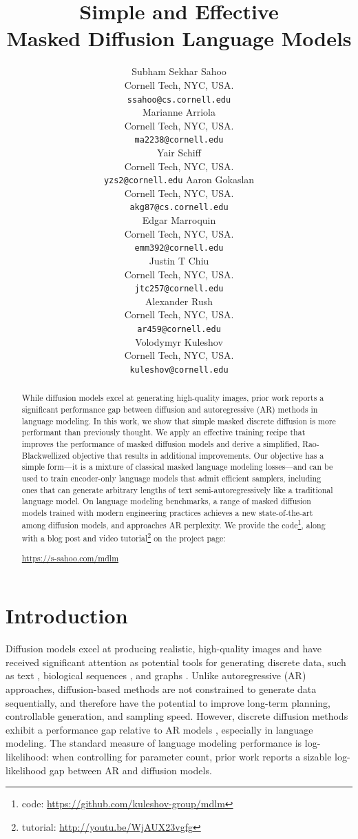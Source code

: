 \documentclass{article} %
\title{Simple and Effective \\ Masked Diffusion Language Models}
\author{%
  Subham Sekhar Sahoo\\
  Cornell Tech, NYC, USA.\\
  \texttt{ssahoo@cs.cornell.edu} \\
  \And
  Marianne Arriola\\
  Cornell Tech, NYC, USA.\\
  \texttt{ma2238@cornell.edu}\\
  \And
  Yair Schiff\\
  Cornell Tech, NYC, USA.\\
  \texttt{yzs2@cornell.edu}
  \And
  Aaron Gokaslan\\
  Cornell Tech, NYC, USA.\\
  \texttt{akg87@cs.cornell.edu} \\
  \And
  Edgar Marroquin\\
  Cornell Tech, NYC, USA.\\
  \texttt{emm392@cornell.edu} \\
  \And
  Justin T Chiu\\
  Cornell Tech, NYC, USA.\\
  \texttt{jtc257@cornell.edu}\\
  \And
  Alexander Rush\\
  Cornell Tech, NYC, USA.\\
  \texttt{ar459@cornell.edu}\\
  \And
  Volodymyr Kuleshov\\
  Cornell Tech, NYC, USA.\\
  \texttt{kuleshov@cornell.edu} \\
}
\begin{document}
\maketitle


\begin{abstract}
While diffusion models excel at generating high-quality images, prior work reports a significant performance gap between diffusion and autoregressive (AR) methods in language modeling.
In this work, we show that simple masked discrete diffusion is more performant than previously thought.
We apply an effective training recipe that improves the performance of masked diffusion models and derive a simplified, Rao-Blackwellized objective that results in additional improvements.
Our objective has a simple form---it is a mixture of classical masked language modeling losses---and can be used to train encoder-only language models that admit efficient samplers, including ones that can generate arbitrary lengths of text semi-autoregressively like a traditional language model.
On language modeling benchmarks, a range of masked diffusion models trained with modern engineering practices achieves a new state-of-the-art among diffusion models, and approaches AR perplexity. We provide the code\footnote{code: \href{https://github.com/kuleshov-group/mdlm}{https://github.com/kuleshov-group/mdlm}}, along with a blog post and video tutorial\footnote{tutorial: \href{http://youtu.be/WjAUX23vgfg}{http://youtu.be/WjAUX23vgfg}} on the project page:

\vspace{0.3ex}
\centerline{\href{https://s-sahoo.com/mdlm}{https://s-sahoo.com/mdlm}}



\end{abstract}


\section{Introduction}

Diffusion models excel at producing realistic, high-quality images and have 
received significant attention as potential tools for generating discrete data, such as text \citep{austin2021structured, li2021discovering, lou2023discrete}, biological sequences \citep{avdeyev2023dirichlet,rastogi2023semi}, and graphs \citep{sun2023difusco, vignac2022digress}. 
Unlike autoregressive (AR) approaches, diffusion-based methods are not constrained to generate data sequentially, and therefore have the potential to improve long-term planning, controllable generation, and sampling speed. %
However, discrete diffusion methods exhibit a performance gap relative to AR models \citep{austin2021structured, gulrajani2024plaid, he2022diffusionbert, lou2023discrete},
especially in language modeling. %
The standard measure of language modeling performance is log-likelihood: 
when controlling for parameter count, prior work reports a sizable log-likelihood gap between AR and diffusion models.
\end{document}
